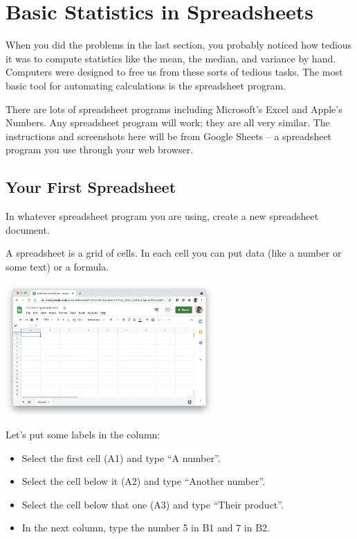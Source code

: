 \chapter{Basic Statistics in Spreadsheets}

When you did the problems in the last section, you probably noticed
how tedious it was to compute statistics like the mean, the median,
and variance by hand. Computers were designed to free us from these
sorts of tedious tasks. The most basic tool for automating
calculations is the spreadsheet program.

There are lots of spreadsheet programs including Microsoft's Excel and
Apple's Numbers. Any spreadsheet program will work; they are all very
similar.  The instructions and screenshots here will be from Google
Sheets -- a spreadsheet program you use through your web browser.

\section{Your First Spreadsheet}

In whatever spreadsheet program you are using, create a new spreadsheet document.

A spreadsheet is a grid of cells.  In each cell you can put data (like a number or some text) or a formula.

\includegraphics[width=0.6\textwidth]{BlankSheet.png}

Let's put some labels in the column:
\begin{itemize}
\item Select the first cell (A1) and type ``A number''.
\item Select the cell below it (A2) and type ``Another number''.
\item Select the cell below that one (A3) and type ``Their product''.
\item In the next column, type the number 5 in B1 and 7 in B2.
\end{itemize}

